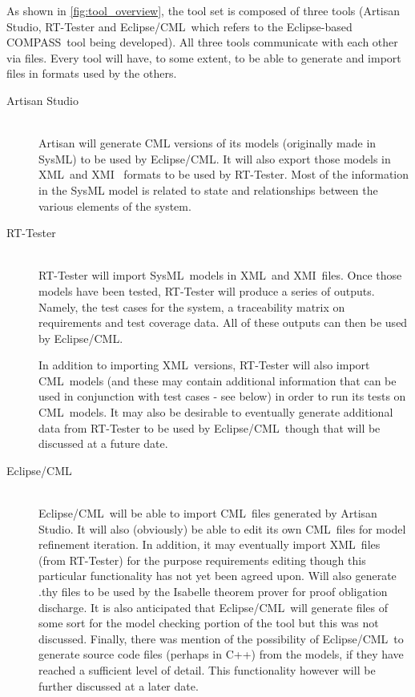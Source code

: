 \documentclass[a4paper,12pt,english]{article}
\def\compass{COMPASS}
\def\eclipsecml{Eclipse/CML}
\def\cml{CML}
\def\xml{XML}
\def\xmi{XMI}
\def\sysml{SysML}
\begin{document}
	As shown in \autoref{fig:tool_overview}, the tool set is composed of three tools (Artisan Studio, RT-Tester and \eclipsecml\ which refers to the Eclipse-based \compass\ tool being developed).  All three tools communicate with each other via files. Every tool will have, to some extent, to be able to generate and import files in formats used by the others.

\begin{description}
	\item[Artisan Studio] \hfill \\
	Artisan will generate CML versions of its models (originally made in SysML) to be used by \eclipsecml. It will also export those models in \xml\ and \xmi\ \fixme{Check \xml/\xmi\ generation and export} formats to be used by RT-Tester. Most of the information in the SysML model is related to state and relationships between the various elements of the system.

	\item[RT-Tester]  \hfill \\
	RT-Tester will import \sysml\ models in \xml\ and \xmi\ files. Once those models have been tested, RT-Tester will produce a series of outputs. Namely, the test cases for the system, a traceability matrix on requirements and test coverage data. All of these outputs can then be used by \eclipsecml. 

	In addition to importing \xml\ versions, RT-Tester will also import \cml\ models (and these may contain additional information that can be used in conjunction with test cases - see below) in order to run its tests on \cml\ models. It may also be desirable to eventually generate additional data from RT-Tester to be used by \eclipsecml\ though that will be discussed at a future date.

	\item[\eclipsecml]  \hfill \\
	\eclipsecml\ will be able to import \cml\ files generated by Artisan Studio. It will also (obviously) be able to edit its own \cml\ files for model refinement iteration. In addition, it may eventually import \xml\ files (from RT-Tester) for the purpose requirements editing though this particular functionality has not yet been agreed upon. Will also generate .thy files to be used by the Isabelle theorem prover for proof obligation discharge. It is also anticipated that \eclipsecml\ will generate files of some sort for the model checking portion of the tool but this was not discussed. Finally, there was mention of the possibility of \eclipsecml\ to generate source code files (perhaps in C++) from the models, if they have reached a sufficient level of detail. This functionality however will be further discussed at a later date.


\end{description}
\end{document}
